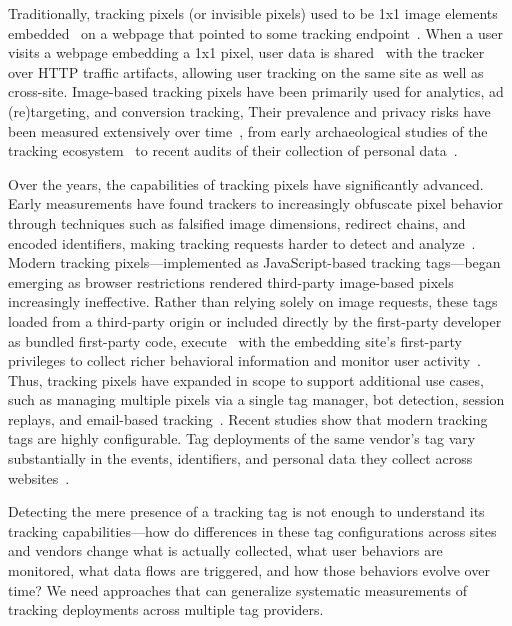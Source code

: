 Traditionally, tracking pixels (or invisible pixels) used to be 1x1 image elements embedded \symInclusion\ on a webpage that pointed to some tracking endpoint~\cite{Narayanan2017WebtapSpringer,englehardtOnlineTracking1millionsite2016}.
%
When a user visits a webpage embedding a 1x1 pixel, user data is shared \symSharing\ with the tracker over HTTP traffic artifacts, allowing user tracking on the same site as well as cross-site.
%
Image-based tracking pixels have been primarily used for analytics, ad (re)targeting, and conversion tracking, 
%
Their prevalence and privacy risks have been measured extensively over time~\cite{englehardtOnlineTracking1millionsite2016}, from early archaeological studies of the tracking ecosystem~\cite{lernerInternetJonesRaiders2016} to recent audits of their collection of personal data~\cite{huCharacterizingPixelTracking2019,bekosPIIxelLeaksPassive2025}.


Over the years, the capabilities of tracking pixels have significantly advanced.
%
Early measurements have found trackers to increasingly obfuscate pixel behavior through techniques such as falsified image dimensions, redirect chains, and encoded identifiers, making tracking requests harder to detect and analyze~\cite{huCharacterizingPixelTracking2019}.
%
Modern tracking pixels---implemented as JavaScript-based tracking tags---began emerging as browser restrictions rendered third-party image-based pixels increasingly ineffective.
%
Rather than relying solely on image requests, these tags loaded from a third-party origin or included directly by the first-party developer as bundled first-party code, execute \symExecution\ with the embedding site's first-party privileges to collect richer behavioral information and monitor user activity~\cite{bekosHitchhikersGuideFacebook2023,munirCookieGraphUnderstandingDetecting2023}.
%
Thus, tracking pixels have expanded in scope to support additional use cases, such as managing multiple pixels via a single tag manager, bot detection, session replays, and email-based tracking~\cite{senolLeakyFormsStudy2022,acarNoBoundariesData2020,englehardtNoBoundariesCredentials2018,englehardtNeverSignedThis2018,fouadMissedFilterLists2020}.
%
Recent studies show that modern tracking tags are highly configurable. 
%
Tag deployments of the same vendor's tag vary substantially in the events, identifiers, and personal data they collect across websites~\cite{kiesermanTrackerInstallationsAre2025,bekosPIIxelLeaksPassive2025,ghaniPixelConfigLongitudinalMeasurement2026}. 

\begin{opbox}
Detecting the mere presence of a tracking tag is not enough to understand its tracking capabilities---how do differences in these tag configurations across sites and vendors change what is actually collected, what user behaviors are monitored, what data flows are triggered, and how those behaviors evolve over time? We need approaches that can generalize systematic measurements of tracking deployments across multiple tag providers.
\end{opbox}



